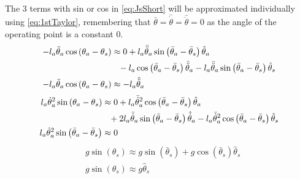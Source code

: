 The 3 terms with sin or cos in \autoref{eq:JsShort} will be approximated individually using \autoref{eq:1stTaylor}, remembering that $\bar{\theta}=\bar{\dot{\theta}}=\bar{\ddot{\theta}}=0$ as the angle of the operating point is a constant 0.
\begin{subequations}
\begin{flalign}
 -l_a\ddot{\theta}_a\cos\left(\theta_a-\theta_s\right) & \approx  0 + l_a\bar{\ddot{\theta}}_a\sin\left(\bar{\theta}_a-\bar{\theta}_s\right)\hat{\theta}_a  \notag \\ 
& \phantom{=} -l_a\cos\left(\bar{\theta}_a-\bar{\theta}_s\right)\hat{\ddot{\theta}}_a - l_a\bar{\ddot{\theta}}_a\sin\left(\bar{\theta}_a-\bar{\theta}_s\right)\hat{\theta}_s   \\
 -l_a\ddot{\theta}_a\cos\left(\theta_a-\theta_s\right) & \approx -l_a\hat{\ddot{\theta}}_a 
\end{flalign} %
\end{subequations}
\begin{subequations}
\begin{flalign}
l_a\dot{\theta}_a^2\sin\left(\theta_a-\theta_s\right) & \approx  0 + l_a\bar{\dot{\theta}}_a^2\cos\left(\bar{\theta}_a-\bar{\theta}_s\right)\hat{\theta}_a  \notag \\
& \phantom{=} + 2l_a\bar{\dot{\theta}}_a\sin\left(\bar{\theta}_a-\bar{\theta}_s\right)\hat{\dot{\theta}}_a-l_a\bar{\dot{\theta}}_a^2\cos\left(\bar{\theta}_a-\bar{\theta}_s\right)\hat{\theta}_s   \\
 l_a\dot{\theta}_a^2\sin\left(\bar{\theta}_a-\bar{\theta}_s\right) & \approx  0 
\end{flalign}
\end{subequations}
\begin{subequations}
\begin{flalign}
& g\sin\left(\theta_s\right) \approx g\sin\left(\bar{\theta}_s\right) +g\cos\left(\bar{\theta}_s\right)\hat{\theta}_s \\
& g\sin\left(\theta_s\right) \approx g\hat{\theta}_s 
\end{flalign}
\end{subequations}

